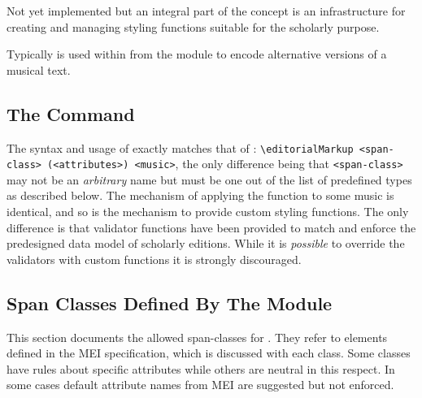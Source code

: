 \documentclass[]{ollmanual}
\newenvironment{Shaded}{}{}
\begin{document}
Not yet implemented but an integral part of the concept is an
infrastructure for creating and managing styling functions suitable for
the scholarly purpose.

Typically  is used within  from the
 module to encode alternative versions of a
musical text.

\hypertarget{the-command}{%
\subsection{\texorpdfstring{The 
Command}{The  Command}}\label{the-command}}

The syntax and usage of  exactly matches that of
:
\texttt{\textbackslash{}editorialMarkup\ \textless{}span-class\textgreater{}\ (\textless{}attributes\textgreater{})\ \textless{}music\textgreater{}},
the only difference being that
\texttt{\textless{}span-class\textgreater{}} may not be an
\emph{arbitrary} name but must be one out of the list of predefined
types as described below. The mechanism of applying the function to some
music is identical, and so is the mechanism to provide custom styling
functions. The only difference is that validator functions have been
provided to match and enforce the predesigned data model of scholarly
editions. While it is \emph{possible} to override the validators with
custom functions it is strongly discouraged.

\begin{Shaded}
\begin{Highlighting}[]

\end{Highlighting}
\end{Shaded}


\hypertarget{span-classes-defined-by-the-module}{%
\subsection{Span Classes Defined By The
Module}\label{span-classes-defined-by-the-module}}

This section documents the allowed span-classes for
. They refer to elements defined in the MEI
specification, which is discussed with each class. Some classes have
rules about specific attributes while others are neutral in this
respect. In some cases default attribute names from MEI are suggested
but not enforced.
\end{document}

